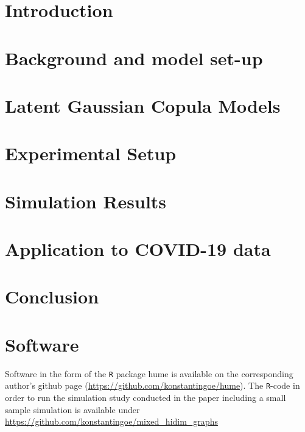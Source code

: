 \documentclass[ejs]{imsart}
\newcommand{\pkg}[1]{{\normalfont\fontseries{b}\selectfont #1}}
\theoremstyle{plain}
\begin{document}


\section{Introduction}
\label{sec::intro}



\section{Background and model set-up}
\label{sec::gaussian}



\section{Latent Gaussian Copula Models}
\label{sec::nonparanormal}



\section{Experimental Setup}\label{sec::setup}



\section{Simulation Results}\label{sec::results}



\section{Application to COVID-19 data}\label{sec::empirical_application}



\section{Conclusion}\label{sec::conclusions}



\section{Software}\label{sec5}

Software in the form of the \texttt{R} package \pkg{hume} is available on the corresponding author's github page (\url{https://github.com/konstantingoe/hume}). The \texttt{R}-code in order to run the simulation study conducted in the paper including a small sample simulation is available under \url{https://github.com/konstantingoe/mixed_hidim_graphs}
\end{document}
